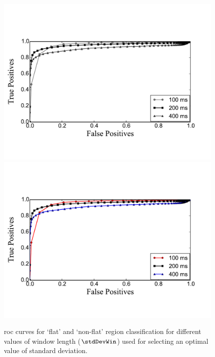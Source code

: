 \begin{figure}
	\begin{center}
		\ifdefined\PRINTVER
			\includegraphics[width=\figSizeSeventy]{ch06_patterns/figures/discovery/ROCFlatness_BW.pdf}
		\else
			\includegraphics[width=\figSizeSeventy]{ch06_patterns/figures/discovery/ROCFlatness.pdf}
		\fi
	\end{center}
	\caption[\acrshort{roc} curve for `flat' and `non-flat' region classification]{\acrshort{roc} curves for `flat' and `non-flat' region classification for different values of window length ($\stdDevWin$) used for selecting an optimal value of standard deviation.}
	\label{fig:ROC_pattern_discovery}
\end{figure}

